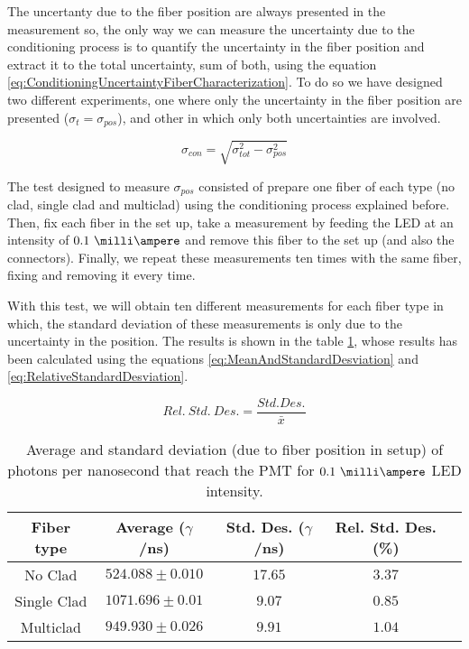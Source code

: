 The uncertanty due to the fiber position are always presented in the measurement so, the only way we can measure the uncertainty due to the conditioning process is to quantify the uncertainty in the fiber position and extract it to the total uncertainty, sum of both, using the equation \ref{eq:ConditioningUncertaintyFiberCharacterization}. To do so we have designed two different experiments, one where only the uncertainty in the fiber position are presented ($\sigma_{t} = \sigma_{pos}$), and other in which only both uncertainties are involved.

\begin{equation}
\sigma_{con} = \sqrt{\sigma^2_{tot} - \sigma^2_{pos} }
\label{eq:ConditioningUncertaintyFiberCharacterization}
\end{equation}

The test designed to measure $\sigma_{pos}$ consisted of prepare one fiber of each type (no clad, single clad and multiclad) using the conditioning process explained before. Then, fix each fiber in the set up, take a measurement by feeding the LED at an intensity of $0.1~\milli\ampere$ and remove this fiber to the set up (and also the connectors). Finally, we repeat these measurements ten times with the same fiber, fixing and removing it every time.

With this test, we will obtain ten different measurements for each fiber type in which, the standard deviation of these measurements is only due to the uncertainty in the position. The results is shown in the table \ref{tab:PositionStandardDeviation}, whose results has been calculated using the equations \ref{eq:MeanAndStandardDesviation} and \ref{eq:RelativeStandardDesviation}.

\begin{equation}
Rel.~Std.~Des. = \frac{Std.Des.}{\bar{x}}
\label{eq:RelativeStandardDesviation}
\end{equation}

\begin{table}[htbp]
\begin{center}
\begin{tabular}{|c|c|c|c|c|}
\hline
Fiber type & Average ($\gamma$/ns) & Std. Des. ($\gamma$/ns) & Rel. Std. Des. (\%)\\
\hline \hline \hline
No Clad & $524.088 \pm 0.010$ & $17.65$ & $3.37$ \\ \hline
Single Clad & $1071.696 \pm 0.01$ & $9.07$ & $0.85$ \\ \hline
Multiclad & $949.930 \pm 0.026$ & $9.91$ & $1.04$ \\ \hline
\end{tabular}
\caption{Average and standard deviation (due to fiber position in setup) of photons per nanosecond that reach the PMT for $0.1~\milli\ampere$ LED intensity.}
\label{tab:PositionStandardDeviation}
\end{center}
\end{table}

